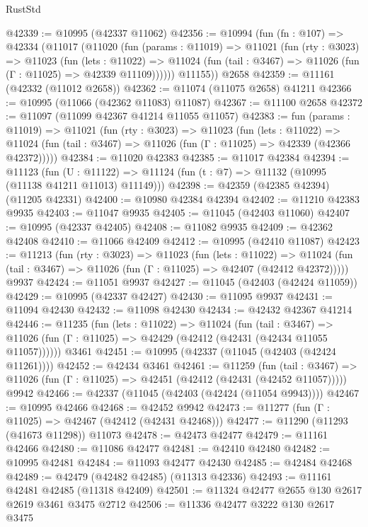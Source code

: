 \begin{lexlean}{RustStd}
\begin{coremodule}
@42339 := @10995 (@42337 @11062)
@42356 := @10994
    (fun (fn : @107) =>
    @42334
      (@11017
        (@11020
          (fun (params : @11019) =>
          @11021
            (fun (rty : @3023) =>
            @11023
              (fun (lets : @11022) =>
              @11024 (fun (tail : @3467) => @11026 (fun (Γ : @11025) => @42339 @11109))))))
        @11155))
    @2658
@42359 := @11161 (@42332 (@11012 @2658))
@42362 := @11074 (@11075 @2658) @41211
@42366 := @10995 (@11066 (@42362 @11083) @11087)
@42367 := @11100 @2658
@42372 := @11097 (@11099 @42367 @41214 @11055 @11057)
@42383 := fun (params : @11019) =>
  @11021
    (fun (rty : @3023) =>
    @11023
      (fun (lets : @11022) =>
      @11024 (fun (tail : @3467) => @11026 (fun (Γ : @11025) => @42339 (@42366 @42372)))))
@42384 := @11020 @42383
@42385 := @11017 @42384
@42394 := @11123
    (fun (U : @11122) => @11124 (fun (t : @7) => @11132 (@10995 (@11138 @41211 @11013) @11149)))
@42398 := @42359 (@42385 @42394) (@11205 @42331)
@42400 := @10980 @42384 @42394
@42402 := @11210 @42383 @9935
@42403 := @11047 @9935
@42405 := @11045 (@42403 @11060)
@42407 := @10995 (@42337 @42405)
@42408 := @11082 @9935
@42409 := @42362 @42408
@42410 := @11066 @42409
@42412 := @10995 (@42410 @11087)
@42423 := @11213
    (fun (rty : @3023) =>
    @11023
      (fun (lets : @11022) =>
      @11024 (fun (tail : @3467) => @11026 (fun (Γ : @11025) => @42407 (@42412 @42372)))))
    @9937
@42424 := @11051 @9937
@42427 := @11045 (@42403 (@42424 @11059))
@42429 := @10995 (@42337 @42427)
@42430 := @11095 @9937
@42431 := @11094 @42430
@42432 := @11098 @42430
@42434 := @42432 @42367 @41214
@42446 := @11235
    (fun (lets : @11022) =>
    @11024
      (fun (tail : @3467) =>
      @11026 (fun (Γ : @11025) => @42429 (@42412 (@42431 (@42434 @11055 @11057))))))
    @3461
@42451 := @10995 (@42337 (@11045 (@42403 (@42424 @11261))))
@42452 := @42434 @3461
@42461 := @11259
    (fun (tail : @3467) => @11026 (fun (Γ : @11025) => @42451 (@42412 (@42431 (@42452 @11057)))))
    @9942
@42466 := @42337 (@11045 (@42403 (@42424 (@11054 @9943))))
@42467 := @10995 @42466
@42468 := @42452 @9942
@42473 := @11277 (fun (Γ : @11025) => @42467 (@42412 (@42431 @42468)))
@42477 := @11290 (@11293 (@41673 @11298)) @11073
@42478 := @42473 @42477
@42479 := @11161 @42466
@42480 := @11086 @42477
@42481 := @42410 @42480
@42482 := @10995 @42481
@42484 := @11093 @42477 @42430
@42485 := @42484 @42468
@42489 := @42479 (@42482 @42485) (@11313 @42336)
@42493 := @11161 @42481 @42485 (@11318 @42409)
@42501 := @11324 @42477 @2655 @130 @2617 @2619 @3461 @3475 @2712
@42506 := @11336 @42477 @3222 @130 @2617 @3475

\end{coremodule}
\end{lexlean}
